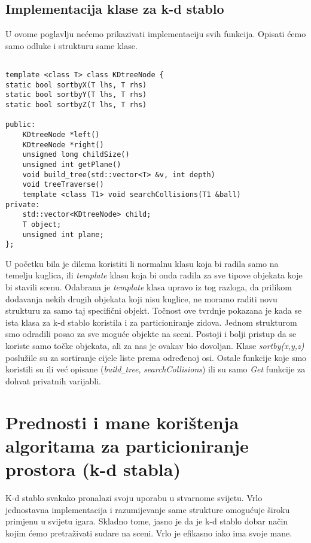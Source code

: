 \subsection{Implementacija klase za k-d stablo}
U ovome poglavlju nećemo prikazivati implementaciju svih funkcija. Opisati ćemo samo odluke i strukturu same klase.
\begin{lstlisting}[style = myC++, label = {code:13}, caption={Implementacija klase za k-d stablo}]

template <class T> class KDtreeNode {
static bool sortbyX(T lhs, T rhs) 
static bool sortbyY(T lhs, T rhs) 
static bool sortbyZ(T lhs, T rhs) 

public:
	KDtreeNode *left()
	KDtreeNode *right() 
	unsigned long childSize() 
	unsigned int getPlane()
	void build_tree(std::vector<T> &v, int depth) 
	void treeTraverse() 
	template <class T1> void searchCollisions(T1 &ball)
private:
	std::vector<KDtreeNode> child;
	T object;
	unsigned int plane;
};

\end{lstlisting}

U početku bila je dilema koristiti li normalnu klasu koja bi radila samo na temelju kuglica, ili \emph{template} klasu koja bi onda radila za sve tipove objekata koje bi stavili scenu. Odabrana je \emph{template} klasa upravo iz tog razloga, da prilikom dodavanja nekih drugih objekata koji nisu kuglice, ne moramo raditi novu strukturu za samo taj specifični objekt. Točnost ove tvrdnje pokazana je kada se ista klasa za k-d stablo koristila i za particioniranje zidova. Jednom strukturom smo odradili posao za sve moguće objekte na sceni. Postoji i bolji pristup da se koriste samo točke objekata, ali za nas je ovakav bio dovoljan. Klase \emph{sortby(x,y,z)} poslužile su za sortiranje cijele liste prema određenoj osi. Ostale funkcije koje smo koristili su ili već opisane (\emph{build\texttt{\_}tree}, \emph{searchCollisions}) ili su samo \emph{Get} funkcije za dohvat privatnih varijabli. \newpage
\section{Prednosti i mane korištenja algoritama za particioniranje prostora (k-d stabla)}

K-d stablo svakako pronalazi svoju uporabu u stvarnome svijetu. Vrlo jednostavna implementacija i razumijevanje same strukture omogućuje široku primjenu u svijetu igara. Skladno tome, jasno je da je k-d stablo dobar način kojim ćemo pretraživati sudare na sceni. Vrlo je efikasno iako ima svoje mane. 

